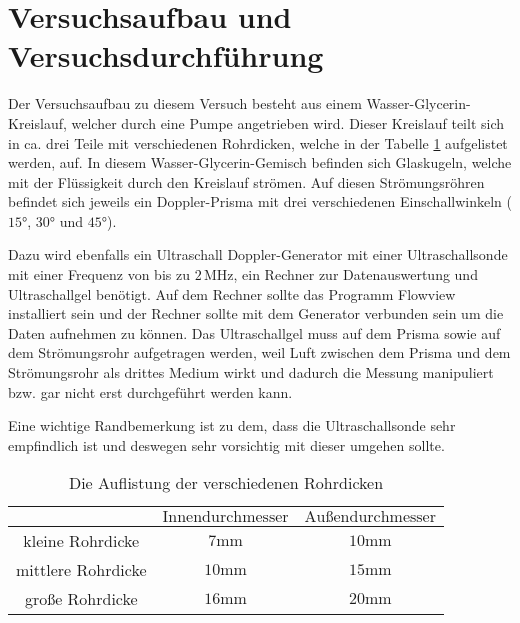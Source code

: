 \section{Versuchsaufbau und Versuchsdurchführung}

\begin{flushleft}
Der Versuchsaufbau zu diesem Versuch besteht aus einem Wasser-Glycerin-Kreislauf, welcher durch eine Pumpe angetrieben wird.
Dieser Kreislauf teilt sich in ca. drei Teile mit verschiedenen Rohrdicken, welche in der Tabelle \ref{Tabelle1} aufgelistet werden, auf.
In diesem Wasser-Glycerin-Gemisch befinden sich Glaskugeln, welche mit der Flüssigkeit durch den Kreislauf strömen.
Auf diesen Strömungsröhren befindet sich jeweils ein Doppler-Prisma mit drei verschiedenen Einschallwinkeln ($15\unit{\degree}$, $30\unit{\degree}$ und $45\unit{\degree}$).
\end{flushleft}

\begin{flushleft}
Dazu wird ebenfalls ein Ultraschall Doppler-Generator mit einer Ultraschallsonde mit einer Frequenz von bis zu $2\,\unit{\mega\hertz}$, ein Rechner zur Datenauswertung und Ultraschallgel benötigt.
Auf dem Rechner sollte das Programm Flowview installiert sein und der Rechner sollte mit dem Generator verbunden sein um die Daten aufnehmen zu können.
Das Ultraschallgel muss auf dem Prisma sowie auf dem Strömungsrohr aufgetragen werden, weil Luft zwischen dem Prisma und dem Strömungsrohr als drittes Medium wirkt und dadurch die Messung manipuliert bzw. gar nicht erst durchgeführt werden kann.
\end{flushleft}
\begin{flushleft}
Eine wichtige Randbemerkung ist zu dem, dass die Ultraschallsonde sehr empfindlich ist und deswegen sehr vorsichtig mit dieser umgehen sollte.
\end{flushleft}

\begin{table}[H]  
    \centering
    \caption{Die Auflistung der verschiedenen Rohrdicken} 
    \label{Tabelle1}
    \begin{tabular} {c  c  c }
        \toprule
        {$  $} &
        {$ \text{Innendurchmesser} $} &
        {$ \text{Außendurchmesser} $} \\
        \midrule
        kleine Rohrdicke   & $7\unit{\milli\meter}$  & $10\unit{\milli\meter}$   \\
        mittlere Rohrdicke & $10\unit{\milli\meter}$ & $15\unit{\milli\meter}$    \\
        große Rohrdicke    & $16\unit{\milli\meter}$ & $20\unit{\milli\meter}$   \\
      
    \end{tabular} 
\end{table}

